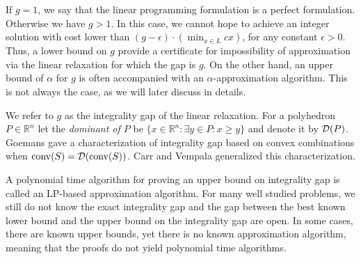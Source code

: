 {\vspace*{5pt}
\noindent{}
\vspace*{3pt}

If $g=1$, we say that the linear programming formulation is a perfect formulation. Otherwise we have $g>1$. In this case, we cannot hope to achieve an integer solution with cost lower than $(g-\epsilon)\cdot (\min_{x\in L}cx)$, for any constant $\epsilon>0$. Thus, a lower bound on $g$ provide a certificate for impossibility of approximation via the linear relaxation for which the gap is $g$. On the other hand, an upper bound of $\alpha$ for $g$ is often accompanied with an $\alpha$-approximation algorithm. This is not always the case, as we will later discuss in details.

We refer to $g$ as the integrality gap of the linear relaxation. For a polyhedron $P\in \mathbb{R}^n$ let the \textit{dominant of $P$} be $\{x\in \mathbb{R}^n: \exists y \in P: x\geq y\}$ and denote it by $\operatorname{\mathcal{D}}(P)$. Goemans \cite{goemansblocking} gave a characterization of integrality gap based on convex combinations when $\operatorname{conv}(S)=\mathcal{D}(\operatorname{conv}(S))$. Carr and Vempala \cite{Carr2004} generalized this characterization.


\vspace*{5pt}
\noindent{}
\vspace*{5pt}




A polynomial time algorithm for proving an upper bound on integrality gap is called an LP-based approximation algorithm. For many well studied problems, we still do not know the exact integrality gap and the gap between the best known lower bound and the upper bound on the integrality gap are open. In some cases, there are known upper bounds, yet there is no known approximation algorithm, meaning that the proofs do not yield polynomial time algorithms.
}\fi

